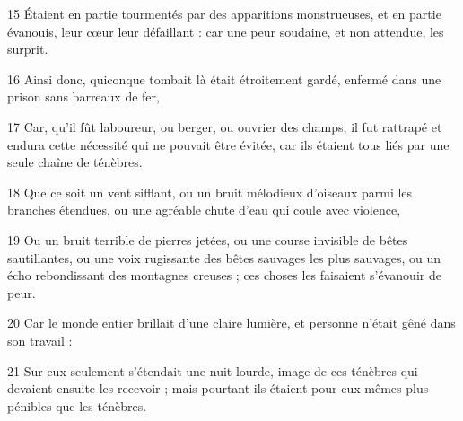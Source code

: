 \par 15 Étaient en partie tourmentés par des apparitions monstrueuses, et en partie évanouis, leur cœur leur défaillant : car une peur soudaine, et non attendue, les surprit.
\par 16 Ainsi donc, quiconque tombait là était étroitement gardé, enfermé dans une prison sans barreaux de fer,
\par 17 Car, qu'il fût laboureur, ou berger, ou ouvrier des champs, il fut rattrapé et endura cette nécessité qui ne pouvait être évitée, car ils étaient tous liés par une seule chaîne de ténèbres.
\par 18 Que ce soit un vent sifflant, ou un bruit mélodieux d'oiseaux parmi les branches étendues, ou une agréable chute d'eau qui coule avec violence,
\par 19 Ou un bruit terrible de pierres jetées, ou une course invisible de bêtes sautillantes, ou une voix rugissante des bêtes sauvages les plus sauvages, ou un écho rebondissant des montagnes creuses ; ces choses les faisaient s’évanouir de peur.
\par 20 Car le monde entier brillait d'une claire lumière, et personne n'était gêné dans son travail :
\par 21 Sur eux seulement s'étendait une nuit lourde, image de ces ténèbres qui devaient ensuite les recevoir ; mais pourtant ils étaient pour eux-mêmes plus pénibles que les ténèbres.


